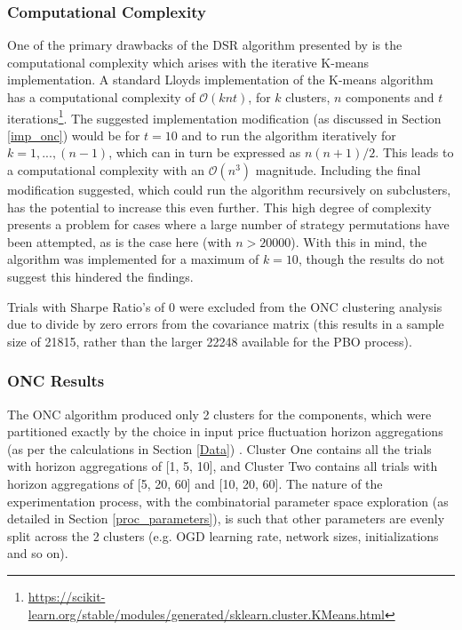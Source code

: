 \documentclass[a4paper,11pt,oneside]{article}
\theoremstyle{plain}
\theoremstyle{definition}
\begin{document}
	\subsubsection{Computational Complexity}
	
	One of the primary drawbacks of the DSR algorithm presented by \citet{PradoDSR} is the computational complexity which arises with the iterative K-means implementation. A standard Lloyds implementation of the K-means algorithm has a computational complexity of $\mathcal{O}(knt)$, for $k$ clusters, $n$ components and $t$ iterations\footnote{\url{https://scikit-learn.org/stable/modules/generated/sklearn.cluster.KMeans.html}}. The suggested implementation modification (as discussed in Section \ref{imp_onc}) would be for $t=10$ and to run the algorithm iteratively for $k=1,...,(n-1)$, which can in turn be expressed as $n(n+1)/2$. This leads to a computational complexity with an $\mathcal{O}(n^3)$ magnitude. Including the final modification suggested, which could run the algorithm recursively on subclusters, has the potential to increase this even further. This high degree of complexity presents a problem for cases where a large number of strategy permutations have been attempted, as is the case here (with $n> 20000$). With this in mind, the algorithm was implemented for a maximum of $k=10$, though the results do not suggest this hindered the findings.\newline
	
	Trials with Sharpe Ratio's of 0 were excluded from the ONC clustering analysis due to divide by zero errors from the covariance matrix (this results in a sample size of 21815, rather than the larger 22248 available for the PBO process).
	
	\subsubsection{ONC Results}\label{results_onc}
	
	The ONC algorithm produced only 2 clusters for the components, which were partitioned exactly by the choice in input price fluctuation horizon aggregations (as per the calculations in Section \ref{Data}) . Cluster One contains all the trials with horizon aggregations of [1, 5, 10], and Cluster Two contains all trials with horizon aggregations of [5, 20, 60] and [10, 20, 60]. The nature of the experimentation process, with the combinatorial parameter space exploration (as detailed in Section \ref{proc_parameters}), is such that other parameters are evenly split across the 2 clusters (e.g. OGD learning rate, network sizes, initializations and so on).\newline
	
\end{document}
